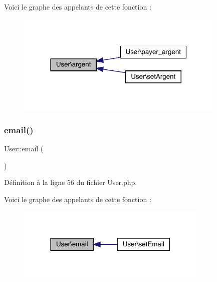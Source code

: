 Voici le graphe des appelants de cette fonction \+:\nopagebreak
\begin{figure}[H]
\begin{center}
\leavevmode
\includegraphics[width=283pt]{class_user_a2a6a97a5e1ddb08da30802aec1b0eb0a_icgraph}
\end{center}
\end{figure}
\mbox{\label{class_user_afffcb74b0fe718305661fb57d5fdfde0}} 
\subsubsection{\texorpdfstring{email()}{email()}}
{\footnotesize\ttfamily User\+::email (\begin{DoxyParamCaption}{ }\end{DoxyParamCaption})}



Définition à la ligne 56 du fichier User.\+php.

Voici le graphe des appelants de cette fonction \+:\nopagebreak
\begin{figure}[H]
\begin{center}
\leavevmode
\includegraphics[width=258pt]{class_user_afffcb74b0fe718305661fb57d5fdfde0_icgraph}
\end{center}
\end{figure}
\mbox{\label{class_user_aa4d14a670efb836bee049266a044d818}} 
